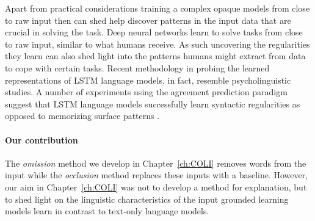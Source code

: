 Apart from practical considerations training a complex opaque models
from close to raw input then can shed help discover patterns in the
input data that are crucial in solving the task.
Deep neural networks learn to solve tasks from close to raw input, similar to
what humans receive. As such
uncovering the regularities they learn can also shed light into the patterns
humans might extract from data to cope with certain tasks.
Recent methodology in probing the learned representations of LSTM language models,
in fact, resemble psycholinguistic studies.
A number of experiments using the agreement prediction paradigm
\citep{bock1991broken} suggest that LSTM language models successfully learn
syntactic regularities as opposed to memorizing surface patterns
\citep{linzen2016assessing,enguehard2017exploring,bernardy2017using,gulordava2018colorless}.

\paragraph{Our contribution}
The \emph{omission} method we develop in Chapter~\ref{ch:COLI} removes words
from the input while the \emph{occlusion} \citep{li2016understanding}
method replaces these inputs with a baseline.
However, our aim in Chapter~\ref{ch:COLI} was not to develop a method for explanation, but to
shed light on the linguistic characteristics of the input grounded learning
models learn in contrast to text-only language models.





